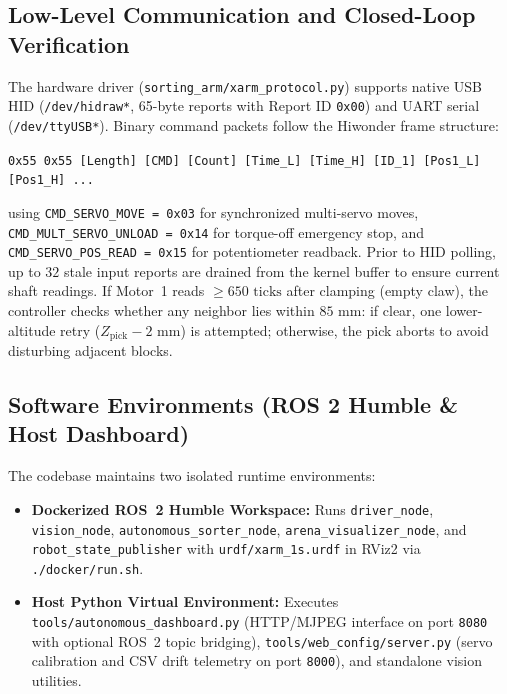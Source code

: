 \documentclass[11pt,a4paper]{article}
\begin{document}
\subsection{Low-Level Communication and Closed-Loop Verification}
The hardware driver (\texttt{sorting\_arm/\allowbreak xarm\_\allowbreak protocol.py}) supports native USB HID (\texttt{/dev/hidraw*}, 65-byte reports with Report ID \texttt{0x00}) and UART serial (\texttt{/dev/ttyUSB*}). Binary command packets follow the Hiwonder frame structure:
\begin{center}
  \footnotesize\texttt{0x55 0x55 [Length] [CMD] [Count] [Time\_L] [Time\_H] [ID\_1] [Pos1\_L] [Pos1\_H] ...}
\end{center}
using \texttt{CMD\_SERVO\_MOVE = 0x03} for synchronized multi-servo moves, \texttt{CMD\_MULT\_SERVO\_UNLOAD = 0x14} for torque-off emergency stop, and \texttt{CMD\_SERVO\_POS\_READ = 0x15} for potentiometer readback. Prior to HID polling, up to $32$ stale input reports are drained from the kernel buffer to ensure current shaft readings. If Motor~1 reads $\ge 650\text{ ticks}$ after clamping (empty claw), the controller checks whether any neighbor lies within $85\text{ mm}$: if clear, one lower-altitude retry ($Z_{\text{pick}} - 2\text{ mm}$) is attempted; otherwise, the pick aborts to avoid disturbing adjacent blocks.

\subsection{Software Environments (ROS 2 Humble \& Host Dashboard)}
The codebase maintains two isolated runtime environments:
\begin{itemize}[noitemsep]
  \item \textbf{Dockerized ROS~2 Humble Workspace:} Runs \texttt{driver\_node}, \texttt{vision\_node}, \texttt{autonomous\_sorter\_node}, \texttt{arena\_visualizer\_node}, and \texttt{robot\_state\_publisher} with \texttt{urdf/xarm\_1s.urdf} in RViz2 via \texttt{./docker/run.sh}.
  \item \textbf{Host Python Virtual Environment:} Executes \texttt{tools/\allowbreak autonomous\_\allowbreak dashboard.py} (HTTP/MJPEG interface on port \texttt{8080} with optional ROS~2 topic bridging), \texttt{tools/\allowbreak web\_config/\allowbreak server.py} (servo calibration and CSV drift telemetry on port \texttt{8000}), and standalone vision utilities.
\end{itemize}

\end{document}
